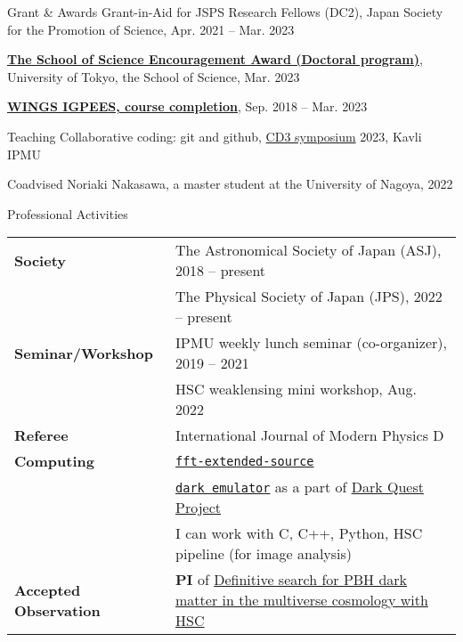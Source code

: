 \documentclass{sty/resume} %
\begin{document}

\begin{rSection}{Grant \& Awards}
  Grant-in-Aid for JSPS Research Fellows (DC2), Japan Society for the Promotion of Science, Apr. 2021 -- Mar. 2023

  {\textbf{\href{https://www.phys.s.u-tokyo.ac.jp/award/37776/}{The School of Science Encouragement Award (Doctoral program)}}}, University of Tokyo, the School of Science, Mar. 2023

  {\textbf{\href{https://www.s.u-tokyo.ac.jp/en/IGPEES/}{WINGS IGPEES, course completion}}}, Sep. 2018 -- Mar. 2023
\end{rSection}

\begin{rSection}{Teaching}
  Collaborative coding: git and github, \href{https://cd3.ipmu.jp/opening/}{CD3 symposium} 2023, Kavli IPMU

  Coadvised Noriaki Nakasawa, a master student at the University of Nagoya, 2022
\end{rSection}


\begin{rSection}{Professional Activities}
    \begin{tabular}{ @{} >{\bfseries}l @{\hspace{6ex}} p{}}
    Society              & The Astronomical Society of Japan (ASJ), 2018 -- present \\
                         & The Physical Society of Japan (JPS), 2022 -- present  \\
    Seminar/Workshop     & IPMU weekly lunch seminar (co-organizer), 2019 -- 2021 \\
                         & HSC weaklensing mini workshop, Aug. 2022  \\
    Referee              & International Journal of Modern Physics D \\
    Computing            & \href{https://github.com/git-sunao/fft-extended-source}{\tt fft-extended-source} \\
                         & \href{https://dark-emulator.readthedocs.io/en/latest/}{\tt dark emulator} as a part of \href{https://darkquestcosmology.github.io}{Dark Quest Project} \\
                         & I can work with C, C++, Python, HSC pipeline (for image analysis) \\
    Accepted Observation & {\textbf{PI}} of \href{https://subarutelescope.org/Observing/Schedule/S20B_abstract/S20B0032abst.html}{Definitive search for PBH dark matter in the multiverse cosmology with HSC}
    \end{tabular}
\end{rSection}
\end{document}
